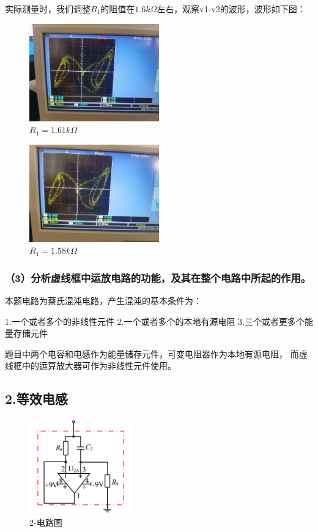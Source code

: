 \documentclass[UTF8]{ctexart}
\begin{document}
实际测量时，我们调整$R_1$的阻值在$1.6k \Omega$左右，观察v1-v2的波形，波形如下图：

\begin{figure}[H]
        \centering
        \includegraphics*[width = 0.5\textwidth]{1-2-1.61k-r.jpg}
        \caption{$R_1 = 1.61k\Omega$}
\end{figure}
\begin{figure}[H]
        \centering
        \includegraphics*[width = 0.5\textwidth]{1-2-1.58k-r.jpg}
        \caption{$R_1 = 1.58k\Omega$}
\end{figure}

\subsubsection*{（3）分析虚线框中运放电路的功能，及其在整个电路中所起的作用。}

本题电路为蔡氏混沌电路，产生混沌的基本条件为：

1.一个或者多个的非线性元件
2.一个或者多个的本地有源电阻
3.三个或者更多个能量存储元件

题目中两个电容和电感作为能量储存元件，可变电阻器作为本地有源电阻，
而虚线框中的运算放大器可作为非线性元件使用。

\subsection*{2.等效电感}

\begin{figure}[H]
        \centering
        \includegraphics[width = 0.4\textwidth]{2-电路图.png}
        \caption{2-电路图}
\end{figure}
\end{document}
